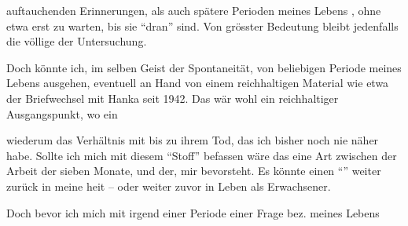  auftauchenden Erinnerungen, als auch spätere Perioden meines Lebens , ohne etwa erst zu warten, bis sie ``dran'' sind. Von grösster Bedeutung bleibt jedenfalls die völlige  der Untersuchung.

Doch könnte ich, im selben Geist der Spontaneität, von  beliebigen Periode meines Lebens ausgehen, eventuell an Hand von einem reichhaltigen Material wie etwa der Briefwechsel mit Hanka seit 1942. Das wär wohl ein reichhaltiger Ausgangspunkt, wo ein 

wiederum das Verhältnis mit  bis zu ihrem Tod, das ich bisher noch nie näher  habe. Sollte ich mich  mit diesem ``Stoff'' befassen wäre das eine Art  zwischen der Arbeit der  sieben Monate, und der,  mir bevorsteht. Es könnte einen ``''   weiter zurück in meine heit -- oder weiter zuvor in Leben als Erwachsener.

Doch bevor ich mich  mit irgend einer Periode  einer Frage bez. meines Lebens
